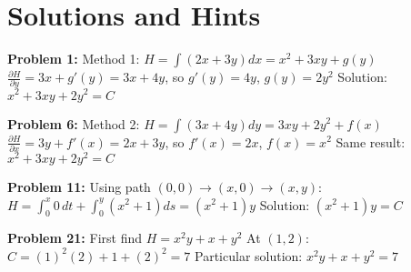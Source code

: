 \documentclass[12pt]{article}
\begin{document}
\section*{Solutions and Hints}

\textbf{Problem 1:} Method 1: $H = \int(2x + 3y)dx = x^2 + 3xy + g(y)$
$\frac{\partial H}{\partial y} = 3x + g'(y) = 3x + 4y$, so $g'(y) = 4y$, $g(y) = 2y^2$
Solution: $x^2 + 3xy + 2y^2 = C$

\textbf{Problem 6:} Method 2: $H = \int(3x + 4y)dy = 3xy + 2y^2 + f(x)$
$\frac{\partial H}{\partial x} = 3y + f'(x) = 2x + 3y$, so $f'(x) = 2x$, $f(x) = x^2$
Same result: $x^2 + 3xy + 2y^2 = C$

\textbf{Problem 11:} Using path $(0,0) \to (x,0) \to (x,y)$:
$H = \int_0^x 0 \, dt + \int_0^y (x^2 + 1)ds = (x^2 + 1)y$
Solution: $(x^2 + 1)y = C$

\textbf{Problem 21:} First find $H = x^2y + x + y^2$
At $(1,2)$: $C = (1)^2(2) + 1 + (2)^2 = 7$
Particular solution: $x^2y + x + y^2 = 7$
\end{document}
